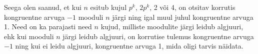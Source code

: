 \documentclass[a4paper, 10pt]{article}
\begin{document}
Seega olen saanud, et kui $n$ esitub kujul $p^k$, $2p^k$, 2 või 4, on otsitav korrutis kongruentne arvuga $-1$ mooduli $n$ järgi ning igal muul juhul kongruentne arvuga 1. Need on ka parajasti need $n$ kujud, milliste moodulite järgi leidub algjuuri, ehk kui mooduli $n$ järgi leidub algjuuri, on korrutise tulemus kongruentne arvuga $-1$ ning kui ei leidu algjuuri, kongruentne arvuga 1, mida oligi tarvis näidata.
\end{document}
